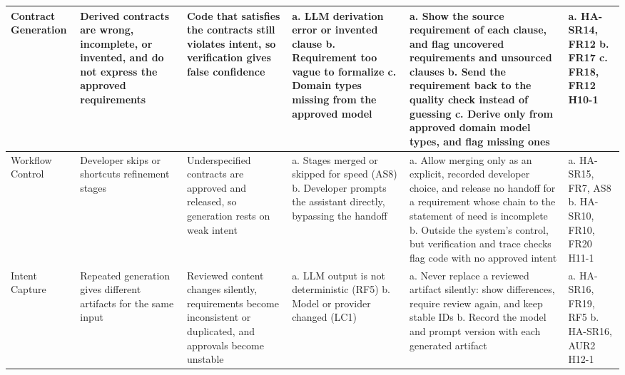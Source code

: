 \documentclass{article}
\begin{document}
\begin{landscape}
\begin{small}
\begin{longtable}{|p{2.1cm}|p{2.4cm}|p{2.8cm}|p{3.2cm}|p{3.6cm}|p{2.4cm}|}
Contract Generation &
Derived contracts are wrong, incomplete, or invented, and do not express the
approved requirements &
Code that satisfies the contracts still violates intent, so verification
gives false confidence &
a. LLM derivation error or invented clause\newline
b. Requirement too vague to formalize\newline
c. Domain types missing from the approved model &
a. Show the source requirement of each clause, and flag uncovered
requirements and unsourced clauses\newline
b. Send the requirement back to the quality check instead of guessing\newline
c. Derive only from approved domain model types, and flag missing ones &
a. HA-SR14, FR12\newline
b. FR17\newline
c. FR18, FR12\newline
H10-1 \\
\hline

Workflow Control &
Developer skips or shortcuts refinement stages &
Underspecified contracts are approved and released, so generation rests on
weak intent &
a. Stages merged or skipped for speed (AS8)\newline
b. Developer prompts the assistant directly, bypassing the handoff &
a. Allow merging only as an explicit, recorded developer choice, and release
no handoff for a requirement whose chain to the statement of need is
incomplete\newline
b. Outside the system's control, but verification and trace checks flag code
with no approved intent &
a. HA-SR15, FR7, AS8\newline
b. HA-SR10, FR10, FR20\newline
H11-1 \\
\hline

Intent Capture &
Repeated generation gives different artifacts for the same input &
Reviewed content changes silently, requirements become inconsistent or
duplicated, and approvals become unstable &
a. LLM output is not deterministic (RF5)\newline
b. Model or provider changed (LC1) &
a. Never replace a reviewed artifact silently: show differences, require review
again, and keep stable IDs\newline
b. Record the model and prompt version with each generated artifact &
a. HA-SR16, FR19, RF5\newline
b. HA-SR16, AUR2\newline
H12-1 \\
\hline

\end{longtable}
\end{small}
\end{landscape}
\end{document}

